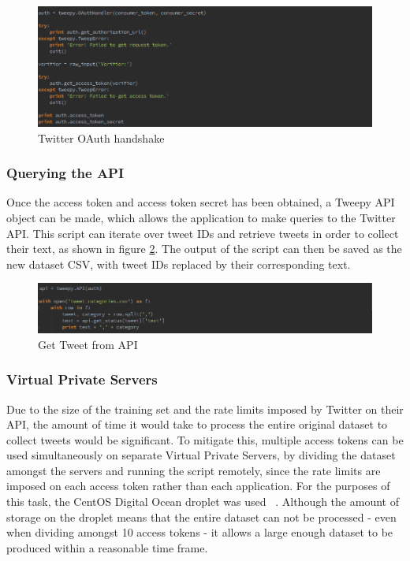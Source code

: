 \begin{figure}[H]
	\centering
	\includegraphics[width=\textwidth]{Images/Implementation/oauth}
	\caption{Twitter OAuth handshake} \label{fig:oauth}
\end{figure}

\subsubsection{Querying the API}
Once the access token and access token secret has been obtained, a Tweepy API object can be made, which allows the application to make queries to the Twitter API. This script can iterate over tweet IDs and retrieve tweets in order to collect their text, as shown in figure \ref{fig:get-tweets}. The output of the script can then be saved as the new dataset CSV, with tweet IDs replaced by their corresponding text.

\begin{figure}[H]
	\centering
	\includegraphics[width=\textwidth]{Images/Implementation/get-tweets}
	\caption{Get Tweet from API} \label{fig:get-tweets}
\end{figure}

\subsubsection{Virtual Private Servers}
Due to the size of the training set and the rate limits imposed by Twitter on their API, the amount of time it would take to process the entire original dataset to collect tweets would be significant. To mitigate this, multiple access tokens can be used simultaneously on separate Virtual Private Servers, by dividing the dataset amongst the servers and running the script remotely, since the rate limits are imposed on each access token rather than each application. For the purposes of this task, the CentOS Digital Ocean droplet was used ~\cite{DigitalOcean:Home}. Although the amount of storage on the droplet means that the entire dataset can not be processed - even when dividing amongst 10 access tokens - it allows a large enough dataset to be produced within a reasonable time frame.

